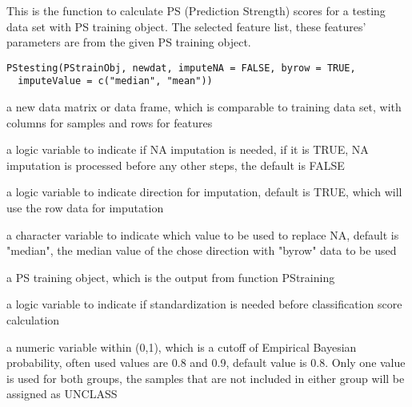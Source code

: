 \documentclass[letterpaper]{book}
\begin{document}
%
\begin{Description}\relax
This is the function to calculate PS (Prediction Strength) scores for a testing data set
with PS training object. The selected feature list, these features' parameters are 
from the given PS training object.
\end{Description}
%
\begin{Usage}
\begin{verbatim}
PStesting(PStrainObj, newdat, imputeNA = FALSE, byrow = TRUE,
  imputeValue = c("median", "mean"))
\end{verbatim}
\end{Usage}
%
\begin{Arguments}
\begin{ldescription}
\item[\code{newdat}] a new data matrix or data frame, which is comparable to training data set, 
with columns for samples and rows for features

\item[\code{imputeNA}] a logic variable to indicate if NA imputation is needed, if it is TRUE, NA imputation is 
processed before any other steps, the default is FALSE

\item[\code{byrow}] a logic variable to indicate direction for imputation, default is TRUE, 
which will use the row data for imputation

\item[\code{imputeValue}] a character variable to indicate which value to be used to replace NA, default is "median", 
the median value of the chose direction with "byrow" data to be used

\item[\code{PStraingObj}] a PS training object, which is the output from function PStraining

\item[\code{standardization}] a logic variable to indicate if standardization is needed before classification 
score calculation

\item[\code{classProbCut}] a numeric variable within (0,1), which is a cutoff of Empirical Bayesian probability, 
often used values are 0.8 and 0.9, default value is 0.8. Only one value is used for both groups, 
the samples that are not included in either group will be assigned as UNCLASS
\end{ldescription}
\end{Arguments}
%
\end{document}
